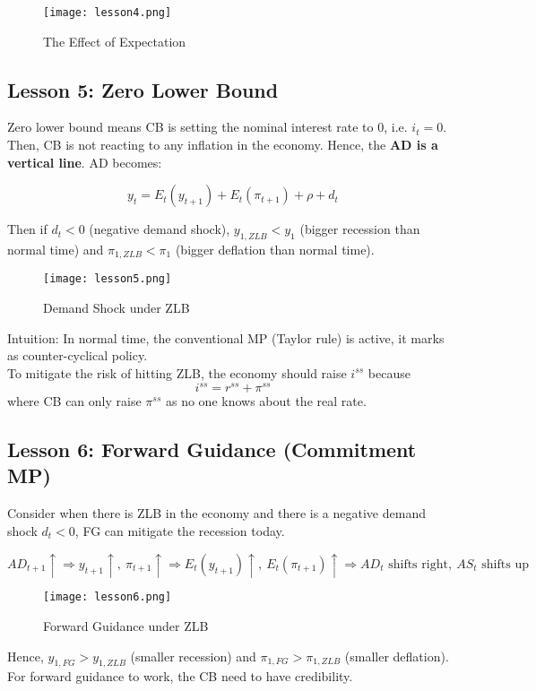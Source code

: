 \documentclass{article}
\begin{document}
\begin{figure}[h!]
    \centering
    \texttt{[image: lesson4.png]}
    \caption{The Effect of Expectation}
    \label{fig:enter-label}
\end{figure}


\subsection{Lesson 5: Zero Lower Bound}
Zero lower bound means CB is setting the nominal interest rate to 0, i.e. $i_t = 0$. Then, CB is not reacting to any inflation in the economy. Hence, the \textbf{AD is a vertical line}. AD becomes:

$$y_t = E_t(y_{t+1}) + E_t(\pi_{t+1}) + \rho + d_t$$

Then if $d_t < 0$ (negative demand shock), $y_{1, ZLB} < y_1$ (bigger recession than normal time) and $\pi_{1,ZLB} < \pi_1$ (bigger deflation than normal time).

\begin{figure}[h!]
    \centering
    \texttt{[image: lesson5.png]}
    \caption{Demand Shock under ZLB}
    \label{fig:enter-label}
\end{figure}

{\color{ForestGreen}\noindent Intuition: In normal time, the conventional MP (Taylor rule) is active, it marks as counter-cyclical policy.}\\

\noindent To mitigate the risk of hitting ZLB, the economy should raise $i^{ss}$ because 
$$i^{ss} = r^{ss} + \pi^{ss}$$
\noindent where CB can only raise $\pi^{ss}$ as no one knows about the real rate.


\subsection{Lesson 6: Forward Guidance (Commitment MP)}

Consider when there is ZLB in the economy and there is a negative demand shock $d_t < 0$, FG can mitigate the recession today.

$$AD_{t+1}\uparrow \Rightarrow y_{t+1}\uparrow,\ \pi_{t+1}\uparrow\Rightarrow E_t(y_{t+1})\uparrow,\ E_t(\pi_{t+1})\uparrow \Rightarrow AD_t\text{ shifts right},\  AS_t \text{ shifts up}$$

\begin{figure}[h!]
    \centering
    \texttt{[image: lesson6.png]}
    \caption{Forward Guidance under ZLB}
    \label{fig:enter-label}
\end{figure}

\noindent Hence, $y_{1, FG} > y_{1, ZLB}$ (smaller recession) and $\pi_{1, FG} > \pi_{1, ZLB}$ (smaller deflation).\\

\noindent For forward guidance to work, the CB need to have credibility.
\end{document}
